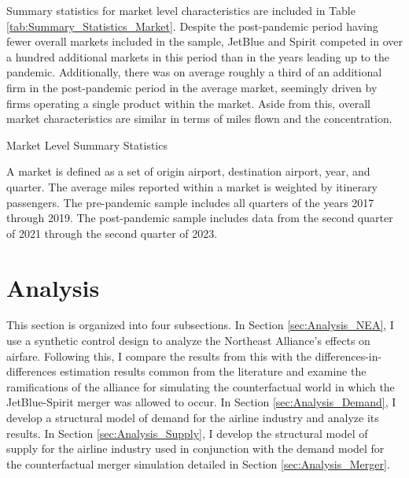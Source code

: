 \documentclass{article}
\begin{document}
    Summary statistics for market level characteristics are included in Table \ref{tab:Summary_Statistics_Market}. Despite the post-pandemic period having fewer overall markets included in the sample, JetBlue and Spirit competed in over a hundred additional markets in this period than in the years leading up to the pandemic. Additionally, there was on average roughly a third of an additional firm in the post-pandemic period in the average market, seemingly driven by firms operating a single product within the market. Aside from this, overall market characteristics are similar in terms of miles flown and the concentration. 

    \begin{table}
        \caption{Market Level Summary Statistics}
        \label{tab:Summary_Statistics_Market}
                \vspace{-15mm}
\begin{center}
            
                    \footnotesize{A market is defined as a set of origin airport, destination airport, year, and quarter. The average miles reported within a market is weighted by itinerary passengers. The pre-pandemic sample includes all quarters of the years 2017 through 2019. The post-pandemic sample includes data from the second quarter of 2021 through the second quarter of 2023. }

\end{center}
    \end{table}

	\section{Analysis}
	\label{sec:Analysis}
	
	This section is organized into four subsections. In Section \ref{sec:Analysis_NEA}, I use a synthetic control design to analyze the Northeast Alliance's effects on airfare. Following this, I compare the results from this with the differences-in-differences estimation results common from the literature and examine the ramifications of the alliance for simulating the counterfactual world in which the JetBlue-Spirit merger was allowed to occur. In Section \ref{sec:Analysis_Demand}, I develop a structural model of demand for the airline industry and analyze its results. In Section \ref{sec:Analysis_Supply}, I develop the structural model of supply for the airline industry used in conjunction with the demand model for the counterfactual merger simulation detailed in Section \ref{sec:Analysis_Merger}. 
	
\end{document}
